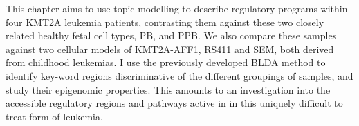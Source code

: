 This chapter aims to use topic modelling to describe regulatory programs within four KMT2A leukemia patients, contrasting them against these two closely related healthy fetal cell types, PB, and PPB. We also compare these samples against two cellular models of KMT2A-AFF1, RS411 and SEM, both derived from childhood leukemias. I use the previously developed BLDA method to identify key-word regions discriminative of the different groupings of samples, and study their epigenomic properties. This amounts to an investigation into the accessible regulatory regions and pathways active in in this uniquely difficult to treat form of leukemia. 











